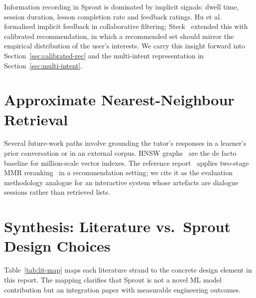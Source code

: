 Information recording in Sprout is dominated by implicit signals: dwell time, session duration, lesson completion rate and feedback ratings. Hu et al.~\cite{hu2008implicit} formalised implicit feedback in collaborative filtering; Steck~\cite{steck2018calibrated} extended this with calibrated recommendation, in which a recommended set should mirror the empirical distribution of the user's interests. We carry this insight forward into Section~\ref{sec:calibrated-rec} and the multi-intent representation in Section~\ref{sec:multi-intent}.

\section{Approximate Nearest-Neighbour Retrieval}
\label{sec:lit-ann}

Several future-work paths involve grounding the tutor's responses in a learner's prior conversation or in an external corpus. HNSW graphs~\cite{malkov2018hnsw} are the de facto baseline for million-scale vector indexes. The reference report~\cite{anh2026mmr} applies two-stage MMR reranking~\cite{carbonell1998mmr} in a recommendation setting; we cite it as the evaluation methodology analogue for an interactive system whose artefacts are dialogue sessions rather than retrieved lists.

\section{Synthesis: Literature vs.\ Sprout Design Choices}
\label{sec:lit-synthesis}

Table~\ref{tab:lit-map} maps each literature strand to the concrete design element in this report. The mapping clarifies that Sprout is not a novel ML model contribution but an integration paper with measurable engineering outcomes.

